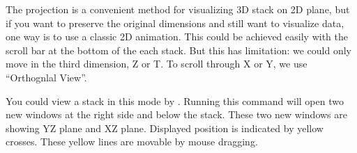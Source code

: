 The projection is a convenient method for visualizing 3D stack on 2D plane, but if you want to preserve the original dimensions and still want to visualize data, one way is to use a classic 2D animation. This could be achieved easily with the scroll bar at the bottom of the each stack. But this has limitation: we could only move in the third dimension, Z or T. To scroll through X or Y, we use ``Orthognlal View''. 

You could view a stack in this mode by . Running this command will open two new windows at the right side and below the stack. These two new windows are showing YZ plane and XZ plane. Displayed position is indicated by yellow crosses. These yellow lines are movable by mouse dragging. 

\begin{figure}[h!]
 \centering

\end{figure}
